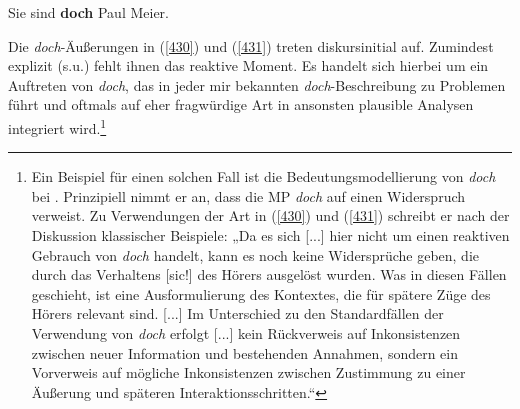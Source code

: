 \begin{exe}
	\ex\label{431} 
	Sie sind \textbf{doch} Paul Meier.
	\hfill\hbox{\citet[126]{Egg2013}}
\end{exe}
Die \textit{doch}-Äußerungen in (\ref{430}) und (\ref{431}) treten diskursinitial auf. Zumindest explizit (s.u.) fehlt ihnen das reaktive Moment. Es handelt sich hierbei um ein Auftreten von \textit{doch}, das in jeder mir bekannten \textit{doch}-Beschreibung zu Problemen führt und oftmals auf eher fragwürdige Art in ansonsten plausible Analysen integriert wird.\footnote{Ein Beispiel für einen solchen Fall ist die Bedeutungsmodellierung von \textit{doch} bei \citet[68]{Koenig1997}. Prinzipiell nimmt er an, dass die MP \textit{doch} auf einen Widerspruch verweist. Zu Verwendungen der Art in (\ref{430}) und (\ref{431}) schreibt er nach der Diskussion klassischer Beispiele:  „Da es sich [...] hier nicht um einen reaktiven Gebrauch von \textit{doch} handelt, kann es noch keine Widersprüche geben, die durch das Verhaltens [sic!] des Hörers ausgelöst wurden. Was in diesen Fällen geschieht, ist eine Ausformulierung des Kontextes, die für spätere Züge des Hö\-rers relevant sind. [...] Im Unterschied zu den Standardfällen der Verwendung von \textit{doch} erfolgt [...] kein Rückverweis auf Inkonsistenzen zwischen neuer Information und bestehenden Annahmen, sondern ein Vorverweis auf mögliche Inkonsistenzen zwischen Zustimmung zu einer Äußerung und späteren Interaktionsschritten.“}

